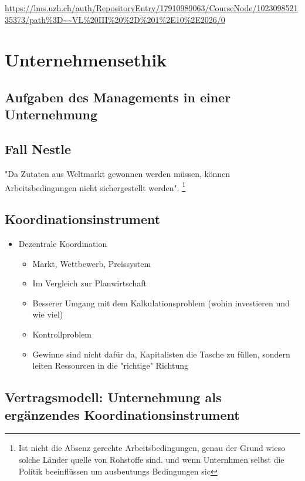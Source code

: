 \pagebreak
{}
\url{https://lms.uzh.ch/auth/RepositoryEntry/17910989063/CourseNode/102309852135373/path%3D~~VL%20III%20%2D%201%2E10%2E2026/0}
\section{Unternehmensethik}

\subsection{Aufgaben des Managements in einer Unternehmung} 

\subsection{Fall Nestle}
"Da Zutaten aus Weltmarkt gewonnen werden müssen, können Arbeitsbedingungen nicht sichergestellt werden". \footnote{Ist nicht die Absenz gerechte Arbeitsbedingungen, genau der Grund wieso solche Länder quelle von Rohstoffe sind. und wenn Unternhmen selbst die Politik beeinflüssen um ausbeutungs Bedingungen sic}

\subsection{Koordinationsinstrument}
\begin{itemize}
    \item Dezentrale Koordination
    \begin{itemize}
        \item Markt, Wettbewerb, Preissystem
    \end{itemize}
    \begin{itemize}
        \item Im Vergleich zur Planwirtschaft
    \end{itemize}
    \begin{itemize}
        \item Besserer Umgang mit dem Kalkulationsproblem (wohin investieren und wie viel)
        \item Kontrollproblem
        \item Gewinne sind nicht dafür da, Kapitalisten die Tasche zu füllen, sondern leiten Ressourcen in die "richtige" Richtung
    \end{itemize}
\end{itemize}

\subsection{Vertragsmodell: Unternehmung als ergänzendes Koordinationsinstrument}

